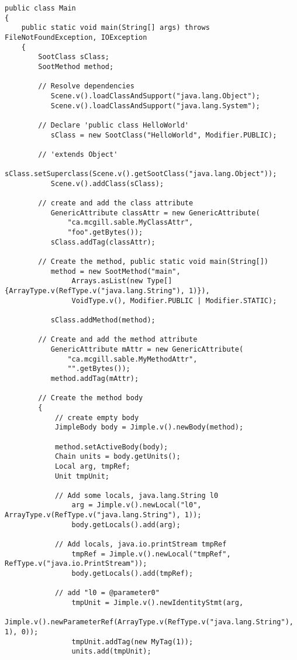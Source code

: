 \documentclass{article}
\begin{document}
\begin{verbatim}
public class Main
{
    public static void main(String[] args) throws FileNotFoundException, IOException
    {
        SootClass sClass;
        SootMethod method;
        
        // Resolve dependencies
           Scene.v().loadClassAndSupport("java.lang.Object");
           Scene.v().loadClassAndSupport("java.lang.System");
           
        // Declare 'public class HelloWorld'   
           sClass = new SootClass("HelloWorld", Modifier.PUBLIC);

        // 'extends Object'
           sClass.setSuperclass(Scene.v().getSootClass("java.lang.Object"));
           Scene.v().addClass(sClass);
           
        // create and add the class attribute
           GenericAttribute classAttr = new GenericAttribute(
               "ca.mcgill.sable.MyClassAttr", 
               "foo".getBytes());
           sClass.addTag(classAttr);
           
        // Create the method, public static void main(String[])
           method = new SootMethod("main",
                Arrays.asList(new Type[] {ArrayType.v(RefType.v("java.lang.String"), 1)}),
                VoidType.v(), Modifier.PUBLIC | Modifier.STATIC);
        
           sClass.addMethod(method);

        // Create and add the method attribute
           GenericAttribute mAttr = new GenericAttribute(
               "ca.mcgill.sable.MyMethodAttr", 
               "".getBytes());
           method.addTag(mAttr);
           
        // Create the method body
        {
            // create empty body
            JimpleBody body = Jimple.v().newBody(method);
            
            method.setActiveBody(body);
            Chain units = body.getUnits();
            Local arg, tmpRef;
            Unit tmpUnit;
            
            // Add some locals, java.lang.String l0
                arg = Jimple.v().newLocal("l0", ArrayType.v(RefType.v("java.lang.String"), 1));
                body.getLocals().add(arg);
            
            // Add locals, java.io.printStream tmpRef
                tmpRef = Jimple.v().newLocal("tmpRef", RefType.v("java.io.PrintStream"));
                body.getLocals().add(tmpRef);
                
            // add "l0 = @parameter0"
                tmpUnit = Jimple.v().newIdentityStmt(arg, 
                     Jimple.v().newParameterRef(ArrayType.v(RefType.v("java.lang.String"), 1), 0));
                tmpUnit.addTag(new MyTag(1));
                units.add(tmpUnit);
            

\end{verbatim}
\end{document}
